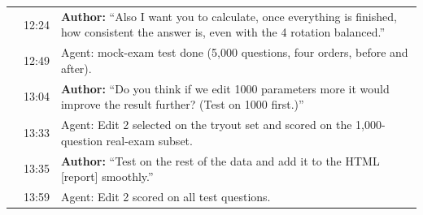 \documentclass[11pt]{article}
\begin{document}
\begin{table}[!ht]
\begin{tabular}{@{}l l p{}@{}}
 & 12:24 & \textbf{Author:} ``Also I want you to calculate, once everything is finished, how consistent the answer is, even with the 4 rotation balanced.'' \\
 & 12:49 & Agent: mock-exam test done (5{,}000 questions, four orders, before and after). \\
 & 13:04 & \textbf{Author:} ``Do you think if we edit 1000 parameters more it would improve the result further? (Test on 1000 first.)'' \\
 & 13:33 & Agent: Edit 2 selected on the tryout set and scored on the 1{,}000-question real-exam subset. \\
 & 13:35 & \textbf{Author:} ``Test on the rest of the data and add it to the HTML [report] smoothly.'' \\
 & 13:59 & Agent: Edit 2 scored on all test questions. \\
\bottomrule
\end{tabular}
\end{table}
\end{document}
